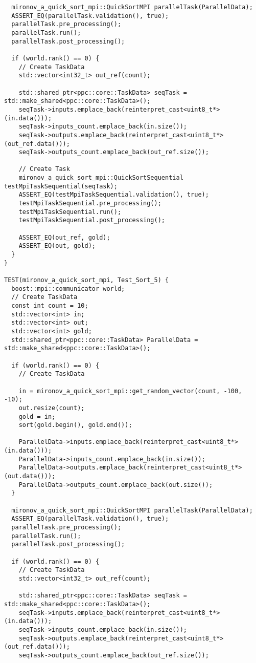 \documentclass[12pt]{article}
\begin{document}
\begin{lstlisting}
  mironov_a_quick_sort_mpi::QuickSortMPI parallelTask(ParallelData);
  ASSERT_EQ(parallelTask.validation(), true);
  parallelTask.pre_processing();
  parallelTask.run();
  parallelTask.post_processing();

  if (world.rank() == 0) {
    // Create TaskData
    std::vector<int32_t> out_ref(count);

    std::shared_ptr<ppc::core::TaskData> seqTask = std::make_shared<ppc::core::TaskData>();
    seqTask->inputs.emplace_back(reinterpret_cast<uint8_t*>(in.data()));
    seqTask->inputs_count.emplace_back(in.size());
    seqTask->outputs.emplace_back(reinterpret_cast<uint8_t*>(out_ref.data()));
    seqTask->outputs_count.emplace_back(out_ref.size());

    // Create Task
    mironov_a_quick_sort_mpi::QuickSortSequential testMpiTaskSequential(seqTask);
    ASSERT_EQ(testMpiTaskSequential.validation(), true);
    testMpiTaskSequential.pre_processing();
    testMpiTaskSequential.run();
    testMpiTaskSequential.post_processing();

    ASSERT_EQ(out_ref, gold);
    ASSERT_EQ(out, gold);
  }
}

TEST(mironov_a_quick_sort_mpi, Test_Sort_5) {
  boost::mpi::communicator world;
  // Create TaskData
  const int count = 10;
  std::vector<int> in;
  std::vector<int> out;
  std::vector<int> gold;
  std::shared_ptr<ppc::core::TaskData> ParallelData = std::make_shared<ppc::core::TaskData>();

  if (world.rank() == 0) {
    // Create TaskData

    in = mironov_a_quick_sort_mpi::get_random_vector(count, -100, -10);
    out.resize(count);
    gold = in;
    sort(gold.begin(), gold.end());

    ParallelData->inputs.emplace_back(reinterpret_cast<uint8_t*>(in.data()));
    ParallelData->inputs_count.emplace_back(in.size());
    ParallelData->outputs.emplace_back(reinterpret_cast<uint8_t*>(out.data()));
    ParallelData->outputs_count.emplace_back(out.size());
  }

  mironov_a_quick_sort_mpi::QuickSortMPI parallelTask(ParallelData);
  ASSERT_EQ(parallelTask.validation(), true);
  parallelTask.pre_processing();
  parallelTask.run();
  parallelTask.post_processing();

  if (world.rank() == 0) {
    // Create TaskData
    std::vector<int32_t> out_ref(count);

    std::shared_ptr<ppc::core::TaskData> seqTask = std::make_shared<ppc::core::TaskData>();
    seqTask->inputs.emplace_back(reinterpret_cast<uint8_t*>(in.data()));
    seqTask->inputs_count.emplace_back(in.size());
    seqTask->outputs.emplace_back(reinterpret_cast<uint8_t*>(out_ref.data()));
    seqTask->outputs_count.emplace_back(out_ref.size());


\end{lstlisting}
\end{document}
